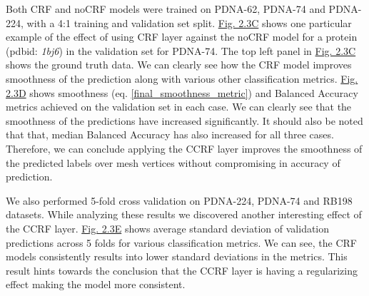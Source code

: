 Both CRF and noCRF models were trained on PDNA-62, PDNA-74 and PDNA-224, with a 4:1 training and validation set
        split. \hyperref[fig:ccrf]{Fig. 2.3C} shows one particular example 
        of the effect of using CRF layer against the noCRF model for a protein (pdbid: \textit{1bj6}) in the validation set
        for PDNA-74. The top left panel in \hyperref[fig:ccrf]{Fig. 2.3C} shows the
        ground truth data. We can clearly see how the CRF model improves smoothness of the
        prediction along with various other classification metrics. \hyperref[fig:ccrf]{Fig. 2.3D}
        shows smoothness (eq.
        \ref{final_smoothness_metric}) and Balanced Accuracy  metrics achieved on the validation set
        in each case. We can clearly see that the smoothness of the predictions have increased significantly.
        It should also be noted that that, median Balanced Accuracy has also increased for all three
        cases. Therefore, we can conclude applying the CCRF layer improves the smoothness of the
        predicted labels over mesh vertices without compromising in accuracy of prediction. 

        We also performed 5-fold cross validation on PDNA-224, PDNA-74 and RB198 datasets. While
        analyzing these results we discovered another interesting effect of the CCRF layer.
        \hyperref[fig:ccrf]{Fig. 2.3E} shows average standard deviation of validation predictions
        across 5 folds for various classification metrics. We can see, the CRF models consistently
        results into lower standard deviations in the metrics. This result hints towards the
        conclusion that the CCRF layer is having a
        regularizing effect making the model more consistent.

